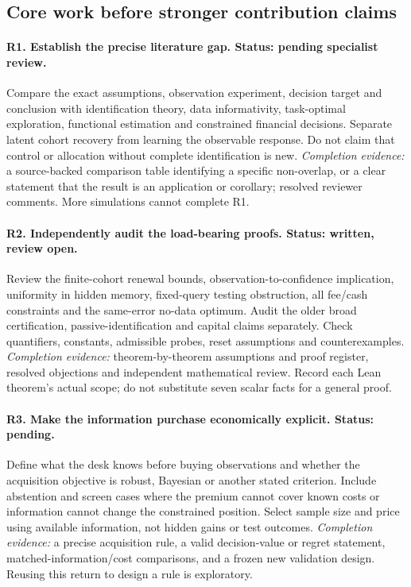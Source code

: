 \subsection*{Core work before stronger contribution claims}
\paragraph{R1. Establish the precise literature gap. Status: pending specialist review.}
Compare the exact assumptions, observation experiment, decision target and
conclusion with identification theory, data informativity, task-optimal
exploration, functional estimation and constrained financial decisions. Separate
latent cohort recovery from learning the observable response. Do not claim
that control or allocation without complete identification is new.
\emph{Completion evidence:} a source-backed comparison table identifying a
specific non-overlap, or a clear statement that the result is an application
or corollary; resolved reviewer comments. More simulations cannot complete R1.

\paragraph{R2. Independently audit the load-bearing proofs. Status: written, review open.}
Review the finite-cohort renewal bounds, observation-to-confidence implication,
uniformity in hidden memory, fixed-query testing obstruction, all fee/cash
constraints and the same-error no-data optimum. Audit the older broad
certification, passive-identification and capital claims separately. Check
quantifiers, constants, admissible probes, reset assumptions and counterexamples.
\emph{Completion evidence:} theorem-by-theorem assumptions and proof register,
resolved objections and independent mathematical review. Record each Lean
theorem's actual scope; do not substitute seven scalar facts for a general proof.

\paragraph{R3. Make the information purchase economically explicit. Status: pending.}
Define what the desk knows before buying observations and whether the acquisition
objective is robust, Bayesian or another stated criterion. Include abstention
and screen cases where the premium cannot cover known costs or information
cannot change the constrained position. Select sample size and price using
available information, not hidden gains or test outcomes.
\emph{Completion evidence:} a precise acquisition rule, a valid decision-value
or regret statement, matched-information/cost comparisons, and a frozen new
validation design. Reusing this return to design a rule is exploratory.


